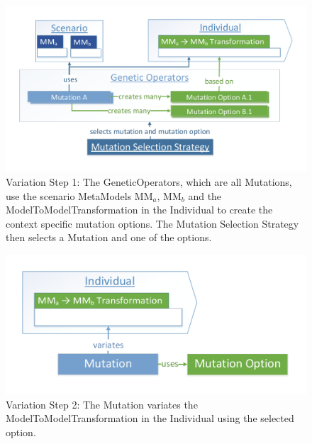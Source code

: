\begin{figure}[htb]
	\centering
	\includegraphics[scale=0.5, trim=0cm 1cm 0cm 1cm, clip=true]{Images/Algorithm_03_Variation_A.pdf} 
	\caption{Variation Step 1: The \glspl{GeneticOperator}, which are all \glspl{Mutation}, use the scenario \glspl{MetaModel} MM$_a$, MM$_b$ and the \gls{ModelToModelTransformation} in the \gls{Individual} to create the context specific mutation options. The Mutation Selection Strategy then selects a \gls{Mutation} and one of the options.}
	\label{figAlgorithm_03_Variation_A}
\end{figure}

\begin{figure}[htb]
	\centering
	\includegraphics[scale=0.5, trim=0cm 1cm 0cm 1cm, clip=true]{Images/Algorithm_03_Variation_B.pdf} 
	\caption{Variation Step 2: The \gls{Mutation} variates the \gls{ModelToModelTransformation} in the \gls{Individual} using the selected option.}
	\label{figAlgorithm_03_Variation_B}
\end{figure}

